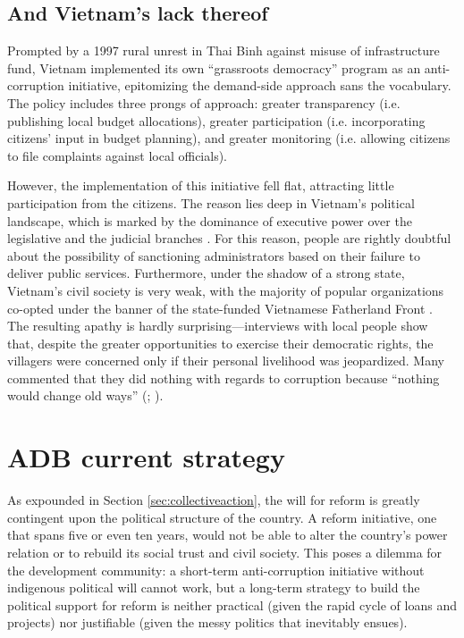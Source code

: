 \documentclass[12pt]{article}
\begin{document}
\subsection{And Vietnam's lack thereof} \label{sec:Vietnam}

Prompted by a 1997 rural unrest in Thai Binh against misuse of infrastructure fund, Vietnam implemented its own ``grassroots democracy'' program as an anti-corruption initiative, epitomizing the demand-side approach sans the vocabulary. The policy includes three prongs of approach: greater transparency (i.e. publishing local budget allocations), greater participation (i.e. incorporating citizens' input in budget planning), and greater monitoring (i.e. allowing citizens to file complaints against local officials).

However, the implementation of this initiative fell flat, attracting little participation from the citizens. The reason lies deep in Vietnam's political landscape, which is marked by the dominance of executive power over the legislative and the judicial branches \citep{Vasavakul2002}. For this reason, people are rightly doubtful about the possibility of sanctioning administrators based on their failure to deliver public services. Furthermore, under the shadow of a strong state, Vietnam's civil society is very weak, with the majority of popular organizations co-opted under the banner of the state-funded Vietnamese Fatherland Front \citep[3]{Thayer2009}. The resulting apathy is hardly surprising---interviews with local people show that, despite the greater opportunities to exercise their democratic rights, the villagers were concerned only if their personal livelihood was jeopardized. Many commented that they did nothing with regards to corruption because ``nothing would change old ways'' (\citealp[28]{Duong2004}; \citealp{Fritzen2005}).

\section{ADB current strategy} \label{sec:currentstrategy}

As expounded in Section \ref{sec:collectiveaction}, the will for reform is greatly contingent upon the political structure of the country. A reform initiative, one that spans five or even ten years, would not be able to alter the country's power relation or to rebuild its social trust and civil society. This poses a dilemma for the development community: a short-term anti-corruption initiative without indigenous political will cannot work, but a long-term strategy to build the political support for reform is neither practical (given the rapid cycle of loans and projects) nor justifiable (given the messy politics that inevitably ensues).
\end{document}
